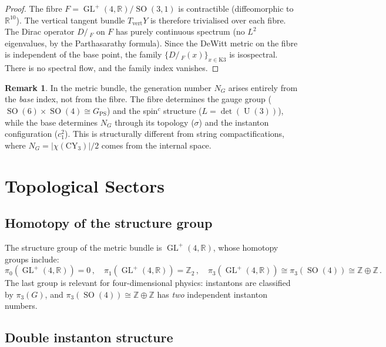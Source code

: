 \documentclass[12pt,a4paper]{article}
\theoremstyle{definition}
\newtheorem{remark}[theorem]{Remark}
\newcommand{\GL}{\operatorname{GL}}
\newcommand{\SO}{\operatorname{SO}}
\newcommand{\U}{\operatorname{U}}
\newcommand{\R}{\mathbb{R}}
\newcommand{\Z}{\mathbb{Z}}
\begin{document}
\begin{proof}
The fibre $F = \GL^+(4,\R)/\SO(3,1)$ is contractible (diffeomorphic to $\R^{10}$).
The vertical tangent bundle $T_{\mathrm{vert}} Y$ is therefore trivialised over each fibre.
The Dirac operator $D\!\!\!\!/\,_F$ on $F$ has purely continuous spectrum (no $L^2$ eigenvalues, by the Parthasarathy formula).
Since the DeWitt metric on the fibre is independent of the base point, the family $\{D\!\!\!\!/\,_F(x)\}_{x \in \mathrm{K3}}$ is isospectral.
There is no spectral flow, and the family index vanishes.
\end{proof}

\begin{remark}
In the metric bundle, the generation number $N_G$ arises entirely from the \emph{base} index, not from the fibre.
The fibre determines the gauge group ($\SO(6) \times \SO(4) \cong G_{\mathrm{PS}}$) and the spin$^c$ structure ($L = \det(\U(3))$), while the base determines $N_G$ through its topology ($\sigma$) and the instanton configuration ($c_1^2$).
This is structurally different from string compactifications, where $N_G = |\chi(\mathrm{CY}_3)|/2$ comes from the internal space.
\end{remark}


\section{Topological Sectors}
\label{sec:topological}

\subsection{Homotopy of the structure group}

The structure group of the metric bundle is $\GL^+(4,\R)$, whose homotopy groups include:
\begin{equation}
\pi_0(\GL^+(4,\R)) = 0\,,\quad \pi_1(\GL^+(4,\R)) = \Z_2\,,\quad \pi_3(\GL^+(4,\R)) \cong \pi_3(\SO(4)) \cong \Z \oplus \Z\,.
\end{equation}
The last group is relevant for four-dimensional physics: instantons are classified by $\pi_3(G)$, and $\pi_3(\SO(4)) \cong \Z \oplus \Z$ has \emph{two} independent instanton numbers.

\subsection{Double instanton structure}
\end{document}
